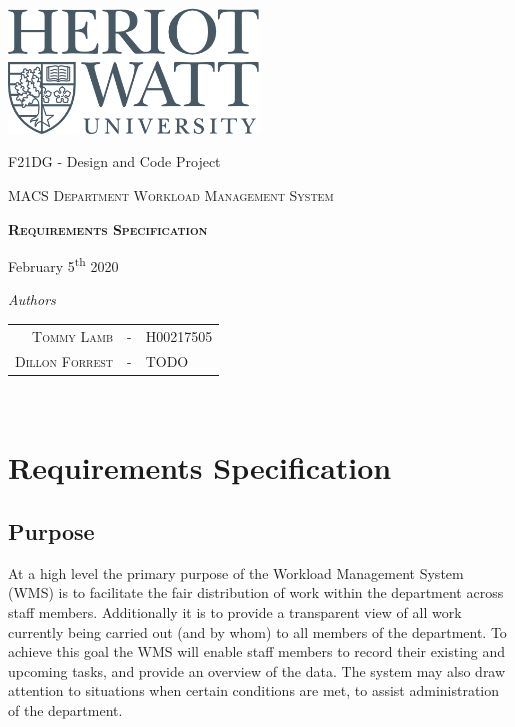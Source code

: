 \documentclass[11pt, a4paper]{article}
\begin{document}
\begin{titlepage}
	\thispagestyle{empty}
	{\centering
		\includegraphics[width=0.5\textwidth]{heriot-watt-logo.png}\par\vspace{1cm}
		\vspace{1cm}
		{\LARGE F21DG - Design and Code Project\par}
		{\LARGE \par}
		\vspace{1.5cm}
		{\scshape\Large MACS Department Workload Management System\par}
		\vspace{1.5cm}
		{\scshape\LARGE\bfseries Requirements Specification \par}

		\vspace{3.5cm}
			\begin{center}
					February 5\textsuperscript{th} 2020
			\end{center}
		\textit{Authors}\par
		\begin{tabular}{rcl}
			\\ \textsc{Tommy Lamb} & - & H00217505\\
			\textsc{Dillon Forrest} & - & TODO\\
		\end{tabular} \\
	
	}
\end{titlepage}

\section{Requirements Specification}

\subsection{Purpose}
At a high level the primary purpose of the Workload Management System (WMS) is to facilitate the fair distribution of work within the department across staff members. Additionally it is to provide a transparent view of all work currently being carried out (and by whom) to all members of the department. To achieve this goal the WMS will enable staff members to record their existing and upcoming tasks, and provide an overview of the data. The system may also draw attention to situations when certain conditions are met, to assist administration of the department.
\end{document}
